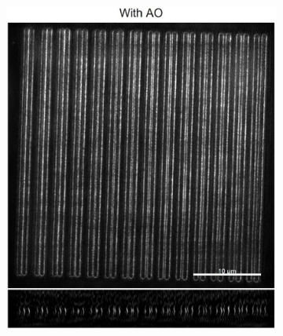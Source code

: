 \begin{figure}
\begin{subfigure}[t]{0.45\textwidth}
		\includegraphics[width=\linewidth]{images/Argolight_slide_AO.jpg}
		\caption{}
		\label{fig:Argolight_slide_AO}
	\end{subfigure}



\end{figure}
